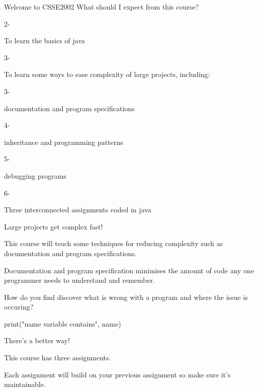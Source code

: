 \documentclass[week2]{csse2002}
\begin{document}
\begin{topic}{Welcome to CSSE2002}
What should I expect from this course?

\begin{itemize}
\begin{subtopic}{2-}
\item To learn the basics of java
\end{subtopic}
\begin{subtopic}{3-}
\item To learn some ways to ease complexity of large projects, including:
\end{subtopic}
\begin{subtopic}{3-}
\item documentation and program specifications
\end{subtopic}
\begin{subtopic}{4-}
\item inheritance and programming patterns
\end{subtopic}
\begin{subtopic}{5-}
\item debugging programs
\end{subtopic}
\begin{subtopic}{6-}
\item Three interconnected assignments coded in java
\end{subtopic}
\end{itemize}

\begin{subtopic}{3}
Large projects get complex fast!

This course will teach some techniques for reducing complexity such as documentation and program specifications.

Documentation and program specification minimises the amount of code any one programmer needs to understand and remember.
\end{subtopic}

\begin{subtopic}{5}
How do you find discover what is wrong with a program and where the issue is occuring?

\begin{python}
print("name variable contains", name)
\end{python}

There's a better way!
\end{subtopic}

\begin{subtopic}{6}
This course has three assignments.

Each assignment will build on your previous assignment so make sure it's maintainable.
\end{subtopic}

\end{topic}
\end{document}
